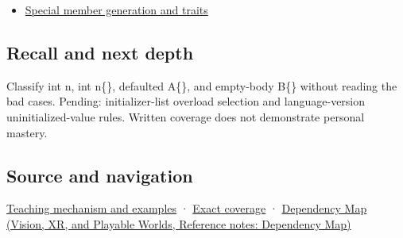 \hypertarget{appendix-ba8c1a9fe03f-used-by}{}

\begin{itemize}
\tightlist
\item
  \hyperref[appendix-42e02a12c694]{Special member generation and traits}
\end{itemize}

\subsection{Recall and next depth}\label{appendix-ba8c1a9fe03f-recall-and-next-depth}

\hypertarget{appendix-ba8c1a9fe03f-recall-and-next-depth}{}

Classify int n, int n\{\}, defaulted A\{\}, and empty-body B\{\} without reading the bad cases. Pending: initializer-list overload selection and language-version uninitialized-value rules. Written coverage does not demonstrate personal mastery.

\subsection{Source and navigation}\label{appendix-ba8c1a9fe03f-source-and-navigation}

\hypertarget{appendix-ba8c1a9fe03f-source-and-navigation}{}

\hyperref[01-foundations-i-ch003-empty-syntax-does-not-promise-initialized-members]{Teaching mechanism and examples} · \hyperref[appendix-fd090d982a15-m009---parts-127-147]{Exact coverage} · \href{../07-Vision-XR-and-Playable-Worlds/main.pdf\#nameddest=appendix-4ad47bdd269a}{Dependency Map (Vision, XR, and Playable Worlds, Reference notes: Dependency Map)}
